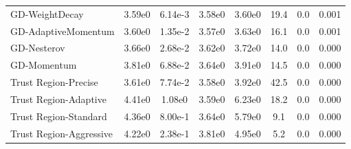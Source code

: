 \documentclass{article}
\begin{document}
\begin{table}[htbp]
{\begin{tabular}{p{2.5cm}*{7}{c}}
GD-WeightDecay & 3.59e0 & 6.14e-3 & 3.58e0 & 3.60e0 & 19.4 & 0.0 & 0.001 \\
GD-AdaptiveMomentum & 3.60e0 & 1.35e-2 & 3.57e0 & 3.63e0 & 16.1 & 0.0 & 0.001 \\
GD-Nesterov & 3.66e0 & 2.68e-2 & 3.62e0 & 3.72e0 & 14.0 & 0.0 & 0.000 \\
GD-Momentum & 3.81e0 & 6.88e-2 & 3.64e0 & 3.91e0 & 14.5 & 0.0 & 0.000 \\
Trust Region-Precise & 3.61e0 & 7.74e-2 & 3.58e0 & 3.92e0 & 42.5 & 0.0 & 0.000 \\
Trust Region-Adaptive & 4.41e0 & 1.08e0 & 3.59e0 & 6.23e0 & 18.2 & 0.0 & 0.000 \\
Trust Region-Standard & 4.36e0 & 8.00e-1 & 3.64e0 & 5.79e0 & 9.1 & 0.0 & 0.000 \\
Trust Region-Aggressive & 4.22e0 & 2.38e-1 & 3.81e0 & 4.95e0 & 5.2 & 0.0 & 0.000 \\
\bottomrule
\end{tabular}
}
\end{table}
\end{document}
